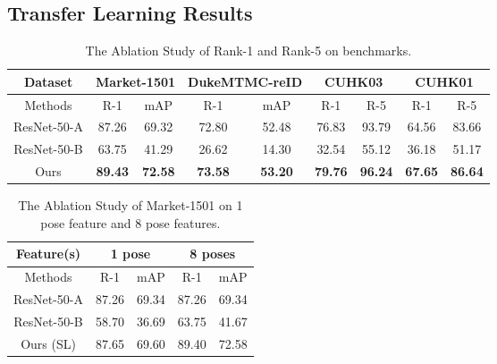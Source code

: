 \documentclass[10pt,letterpaper,twocolumn,10pt,letterpaper,twocolumn]{article}
\providecommand{\tabularnewline}{\\}
\begin{document}
\subsection{Transfer Learning Results}

\begin{table*}
\begin{centering}
\begin{tabular}{c|cc|cc|cc|cc}
\hline 
{\small{}{}Dataset}  & \multicolumn{2}{c|}{{\small{}{}Market-1501}} & \multicolumn{2}{c|}{{\small{}{}DukeMTMC-reID}} & \multicolumn{2}{c|}{{\small{}{}CUHK03}} & \multicolumn{2}{c}{{\small{}{}CUHK01}}\tabularnewline
\hline 
{\small{}{}Methods}  & {\small{}{}R-1}  & {\small{}{}mAP}  & {\small{}{}R-1}  & {\small{}{}mAP}  & {\small{}{}R-1}  & {\small{}{}R-5}  & {\small{}{}R-1}  & {\small{}{}R-5} \tabularnewline
\hline 
\hline 
{\small{}{}ResNet-50-A}  & {\small{}{}{}87.26}  & {\small{}{}{}69.32}  & {\small{}{}72.80}  & {\small{}{}52.48}  & {\small{}{}76.83} & {\small{}{}93.79}  & {\small{}{}64.56}  & {\small{}{}83.66} \tabularnewline
{\small{}{}ResNet-50-B}  & {\small{}{}{}63.75}  & {\small{}{}{}41.29}  & {\small{}{}26.62}  & {\small{}{}14.30}  & {\small{}{}32.54}  & {\small{}{}55.12}  & {\small{}{}36.18}  & {\small{}{}51.17} \tabularnewline
\hline 
{\small{}{}Ours}  & \textbf{\small{}{}{}89.43}{\small{}{}}  & \textbf{\small{}{}{}72.58}{\small{} } & \textbf{\small{}{}73.58}{\small{} } & \textbf{\small{}{}53.20}{\small{} } & \textbf{\small{}{}79.76 }{\small{}{}}  & \textbf{\small{}{}96.24}{\small{}{}}  & \textbf{\small{}{}67.65}{\small{}{}}  & \textbf{\small{}{}86.64}{\small{}{}} \tabularnewline
\hline 
\end{tabular}
\par\end{centering}
\caption{\label{tab:The-Ablation-Study-1}The Ablation Study of Rank-1 and
Rank-5 on benchmarks. }
\end{table*}


\begin{table}
\begin{centering}
{\small{}}\begin{tabular}{@{\extracolsep{\fill}}c|cc|cc}
\hline 
{\small{}Feature(s) } & \multicolumn{2}{c|}{{\small{}{}{}1 pose}} & \multicolumn{2}{c}{{\small{}8 poses}}\tabularnewline
\hline 
{\small{}Methods } & {\small{}R-1 } & {\small{}mAP } & {\small{}{}{}R-1 } & {\small{}mAP}\tabularnewline
\hline 
\hline 
{\small{}ResNet-50-A } & {\small{}87.26} & {\small{}69.34} & {\small{}87.26} & {\small{}69.34}\tabularnewline
{\small{}ResNet-50-B } & 58.70 & 36.69 & {\small{}63.75} & {\small{}41.67}\tabularnewline
\hline 
{\small{}Ours (SL) } & 87.65 & 69.60 & {\small{}89.40} & {\small{}72.58}\tabularnewline
\hline 
\end{tabular}
\par\end{centering}{\small \par}
\caption{\label{tab:The-Ablation-Study-2}The Ablation Study of Market-1501
on 1 pose feature and 8 pose features. }
\end{table}
\end{document}
